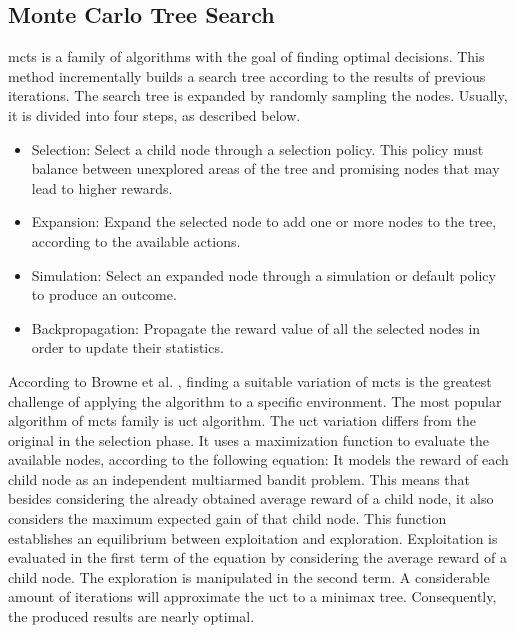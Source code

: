 \subsection{Monte Carlo Tree Search}


\gls{mcts} is a family of algorithms with the goal of finding optimal decisions.
This method incrementally builds a search tree according to the results of previous iterations.
The search tree is expanded by randomly sampling the nodes.
Usually, it is divided into four steps, as described below.
\begin{itemize}
  \item Selection: Select a child node through a selection policy. This policy must balance between unexplored areas of the tree and promising nodes that may lead to higher rewards.
  \item Expansion: Expand the selected node to add one or more nodes to the tree, according to the available actions.
  \item Simulation: Select an expanded node through a simulation or default policy to produce an outcome.
  \item Backpropagation: Propagate the reward value of all the selected nodes in order to update their statistics.
\end{itemize}

According to Browne et al. \cite{Browne2012}, finding a suitable variation of \gls{mcts} is the greatest challenge of applying the algorithm to a specific environment.
The most popular algorithm of \gls{mcts} family is \gls{uct} algorithm.
The \gls{uct} variation differs from the original in the selection phase.
It uses a maximization function to evaluate the available nodes, according to the following equation:
It models the reward of each child node as an independent multiarmed bandit problem.
This means that besides considering the already obtained average reward of a child node, it also considers the maximum expected gain of that child node. 
This function establishes an equilibrium between exploitation and exploration.
Exploitation is evaluated in the first term of the equation by considering the average reward of a child node.
The exploration is manipulated in the second term.
A considerable amount of iterations will approximate the \gls{uct} to a minimax tree.
Consequently, the produced results are nearly optimal.

 